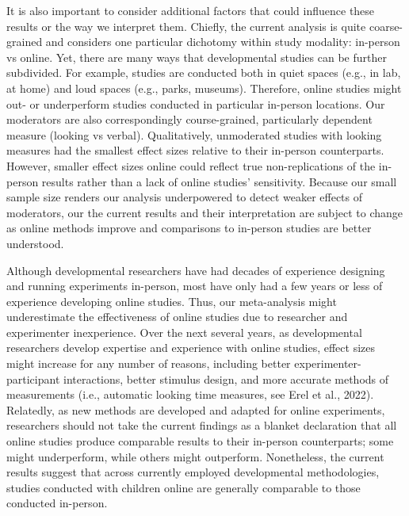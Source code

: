 \documentclass[
  man,floatsintext]{apa6}
\begin{document}
It is also important to consider additional factors that could influence these results or the way we interpret them. Chiefly, the current analysis is quite coarse-grained and considers one particular dichotomy within study modality: in-person vs online. Yet, there are many ways that developmental studies can be further subdivided. For example, studies are conducted both in quiet spaces (e.g., in lab, at home) and loud spaces (e.g., parks, museums). Therefore, online studies might out- or underperform studies conducted in particular in-person locations. Our moderators are also correspondingly course-grained, particularly dependent measure (looking vs verbal). Qualitatively, unmoderated studies with looking measures had the smallest effect sizes relative to their in-person counterparts. However, smaller effect sizes online could reflect true non-replications of the in-person results rather than a lack of online studies' sensitivity. Because our small sample size renders our analysis underpowered to detect weaker effects of moderators, our the current results and their interpretation are subject to change as online methods improve and comparisons to in-person studies are better understood.

Although developmental researchers have had decades of experience designing and running experiments in-person, most have only had a few years or less of experience developing online studies. Thus, our meta-analysis might underestimate the effectiveness of online studies due to researcher and experimenter inexperience. Over the next several years, as developmental researchers develop expertise and experience with online studies, effect sizes might increase for any number of reasons, including better experimenter-participant interactions, better stimulus design, and more accurate methods of measurements (i.e., automatic looking time measures, see Erel et al., 2022). Relatedly, as new methods are developed and adapted for online experiments, researchers should not take the current findings as a blanket declaration that all online studies produce comparable results to their in-person counterparts; some might underperform, while others might outperform. Nonetheless, the current results suggest that across currently employed developmental methodologies, studies conducted with children online are generally comparable to those conducted in-person.
\end{document}
